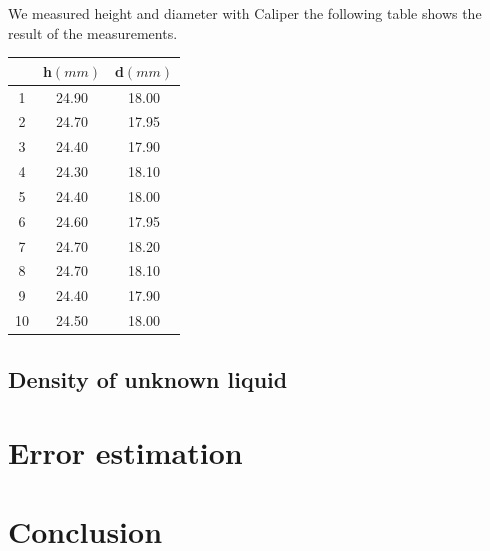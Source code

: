 \documentclass[a4paper, 12pt]{article}
\begin{document}
We measured height and diameter with Caliper the following table shows the result of the measurements.

\begin{center}
	\begin{tabular}{||c c c||} 
		\hline
		&  h\((mm)\) & d\((mm)\)  \\ [0.5ex] 
		\hline\hline
		1 & 24.90 & 18.00 \\ 
		\hline
		2 & 24.70 & 17.95 \\
		\hline
		3 & 24.40 & 17.90 \\
		\hline
		4 & 24.30 & 18.10 \\
		\hline
		5 & 24.40 & 18.00 \\
		\hline
		6 & 24.60 & 17.95 \\
		\hline
		7 & 24.70 & 18.20 \\
		\hline
		8 & 24.70 & 18.10 \\
		\hline
		9 & 24.40 & 17.90  \\
		\hline
		10 & 24.50 & 18.00 \\ [1ex] 
		\hline
	\end{tabular}
\end{center}

\subsection{Density of unknown liquid}



\section{Error estimation}



\section{Conclusion}







\end{document}
